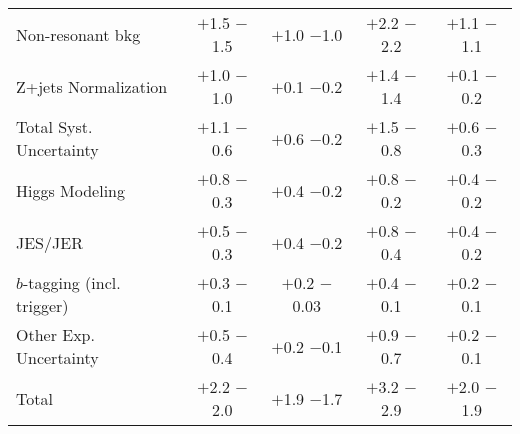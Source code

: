 \documentclass[PAPER, american,coverpage,texlive=2016, english]{\ATLASLATEXPATH atlasdoc}
\begin{document}
\begin{table}[hbtp]
\begin{tabular}{l|cc|cc}
\quad Non-resonant bkg             & $+$1.5 $-$1.5  &  $+$1.0 $-$1.0    &  $+$2.2 $-$2.2  &  $+$1.1 $-$1.1    \\
\quad Z+jets Normalization         & $+$1.0 $-$1.0  &  $+$0.1 $-$0.2    &  $+$1.4 $-$1.4  &  $+$0.1 $-$0.2    \\
\hline
Total Syst. Uncertainty            & $+$1.1 $-$0.6  &  $+$0.6 $-$0.2    &  $+$1.5 $-$0.8  &  $+$0.6 $-$0.3    \\
\quad Higgs Modeling               & $+$0.8 $-$0.3  &  $+$0.4 $-$0.2    &  $+$0.8 $-$0.2  &  $+$0.4 $-$0.2    \\
\quad JES/JER                      & $+$0.5 $-$0.3  &  $+$0.4 $-$0.2    &  $+$0.8 $-$0.4  &  $+$0.4 $-$0.2    \\
\quad $b$-tagging (incl. trigger)  & $+$0.3 $-$0.1  &  $+$0.2 $-$0.03   &  $+$0.4 $-$0.1  &  $+$0.2 $-$0.1    \\
\quad Other Exp. Uncertainty       & $+$0.5 $-$0.4  &  $+$0.2 $-$0.1    &  $+$0.9 $-$0.7  &  $+$0.2 $-$0.1    \\
\hline
Total                    & $+$2.2 $-$2.0    &   $+$1.9 $-$1.7       & $+$3.2 $-$2.9   & $+$2.0 $-$1.9   \\
\hline \hline
\end{tabular}
\end{table}
\end{document}
